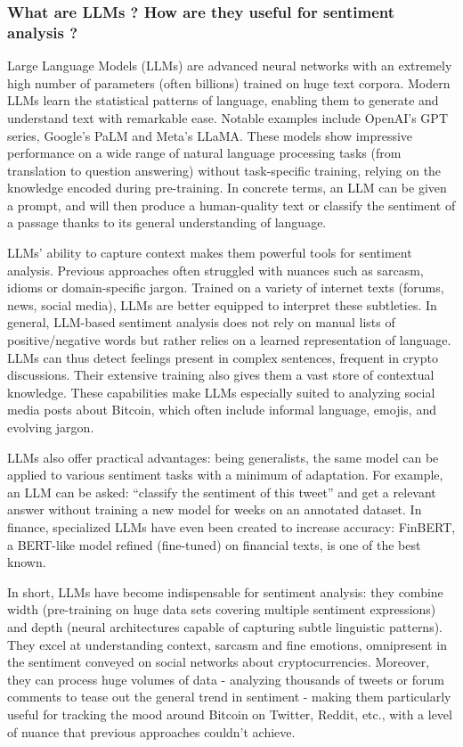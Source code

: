 \documentclass[
  a4paper]{article}
\begin{document}
\hypertarget{what-are-llms-how-are-they-useful-for-sentiment-analysis}{%
\subsubsection{What are LLMs ? How are they useful for sentiment
analysis
?}\label{what-are-llms-how-are-they-useful-for-sentiment-analysis}}

Large Language Models (LLMs) are advanced neural networks with an
extremely high number of parameters (often billions) trained on huge
text corpora. Modern LLMs learn the statistical patterns of language,
enabling them to generate and understand text with remarkable ease.
Notable examples include OpenAI's GPT series, Google's PaLM and Meta's
LLaMA. These models show impressive performance on a wide range of
natural language processing tasks (from translation to question
answering) without task-specific training, relying on the knowledge
encoded during pre-training. In concrete terms, an LLM can be given a
prompt, and will then produce a human-quality text or classify the
sentiment of a passage thanks to its general understanding of language.

LLMs' ability to capture context makes them powerful tools for sentiment
analysis. Previous approaches often struggled with nuances such as
sarcasm, idioms or domain-specific jargon. Trained on a variety of
internet texts (forums, news, social media), LLMs are better equipped to
interpret these subtleties. In general, LLM-based sentiment analysis
does not rely on manual lists of positive/negative words but rather
relies on a learned representation of language. LLMs can thus detect
feelings present in complex sentences, frequent in crypto discussions.
Their extensive training also gives them a vast store of contextual
knowledge. These capabilities make LLMs especially suited to analyzing
social media posts about Bitcoin, which often include informal language,
emojis, and evolving jargon.

LLMs also offer practical advantages: being generalists, the same model
can be applied to various sentiment tasks with a minimum of adaptation.
For example, an LLM can be asked: ``classify the sentiment of this
tweet'' and get a relevant answer without training a new model for weeks
on an annotated dataset. In finance, specialized LLMs have even been
created to increase accuracy: FinBERT, a BERT-like model refined
(fine-tuned) on financial texts, is one of the best known.

In short, LLMs have become indispensable for sentiment analysis: they
combine width (pre-training on huge data sets covering multiple
sentiment expressions) and depth (neural architectures capable of
capturing subtle linguistic patterns). They excel at understanding
context, sarcasm and fine emotions, omnipresent in the sentiment
conveyed on social networks about cryptocurrencies. Moreover, they can
process huge volumes of data - analyzing thousands of tweets or forum
comments to tease out the general trend in sentiment - making them
particularly useful for tracking the mood around Bitcoin on Twitter,
Reddit, etc., with a level of nuance that previous approaches couldn't
achieve.
\end{document}
